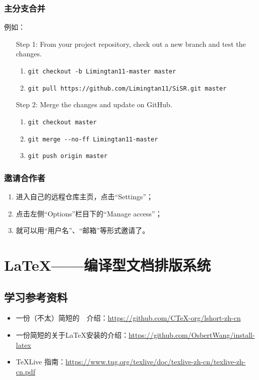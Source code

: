 \subsection{主分支合并}
例如：
\begin{itemize}
\item[Step 1:] From your project repository, check out a new branch and test the changes.
\begin{enumerate}
\item \verb|git checkout -b Limingtan11-master master|

\item \verb|git pull https://github.com/Limingtan11/SiSR.git master|
\end{enumerate}

\item [Step 2:] Merge the changes and update on GitHub.
\begin{enumerate}
\item  \verb|git checkout master|

\item \verb|git merge --no-ff Limingtan11-master|

\item \verb|git push origin master|
\end{enumerate}
\end{itemize}



\subsection{邀请合作者}
\begin{enumerate}
\item 进入自己的远程仓库主页，点击“Settings”；
\item 点击左侧“Options”栏目下的“Manage access”；
\item 就可以用“用户名”、“邮箱”等形式邀请了。
\end{enumerate}













\chapter{\LaTeX{}——编译型文档排版系统}
\section{学习参考资料}
\begin{itemize}
\item 一份（不太）简短的~\LaTeXe{}~介绍：\url{https://github.com/CTeX-org/lshort-zh-cn}
\item 一份简短的关于\LaTeX{}安装的介绍：\url{https://github.com/OsbertWang/install-latex}
\item \TeX Live 指南：\url{https://www.tug.org/texlive/doc/texlive-zh-cn/texlive-zh-cn.pdf}
\end{itemize}


